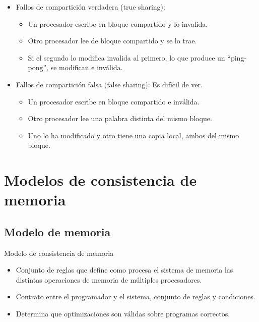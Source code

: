 \documentclass[12pt, twoside, openright]{report} %
\begin{document}
\begin{itemize}

	\item Fallos de compartición verdadera (true sharing):

	      \begin{itemize}

		      \item Un procesador escribe en bloque compartido y lo invalida.
		      \item Otro procesador lee de bloque compartido y se lo trae.
		      \item Si el segundo lo modifica invalida al primero, lo que produce
		            un ``ping-pong'', se modifican e inválida.
	      \end{itemize}
	\item Fallos de compartición falsa (false sharing): Es difícil de ver.

	      \begin{itemize}

		      \item Un procesador escribe en bloque compartido e inválida.
		      \item Otro procesador lee una palabra distinta del mismo bloque.
		      \item Uno lo ha modificado y otro tiene una copia local, ambos del
		            mismo bloque.
	      \end{itemize}
\end{itemize}

\section{Modelos de consistencia de memoria}



\subsection{Modelo de memoria}


Modelo de consistencia de memoria

\begin{itemize}

	\item Conjunto de reglas que define como procesa el sistema de memoria
	      las distintas operaciones de memoria de múltiples procesadores.
	\item Contrato entre el programador y el sistema, conjunto de reglas y
	      condiciones.
	\item Determina que optimizaciones son válidas sobre programas
	      correctos.
\end{itemize}
\end{document}
